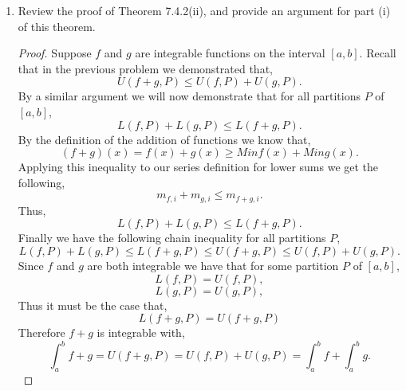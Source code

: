 \documentclass[12pt]{article}
\makeatletter
\theoremstyle{homework}
\newenvironment{exercise}[1]
{\def\@currentlabel{#1}\exercisecore}
{\endexercisecore}
\makeatother
\begin{document}
\begin{exercise}{Abbott 7.4.5}
\begin{enumerate}
	\item Review the proof of Theorem 7.4.2(ii), and provide an argument for part (i) of this theorem.\\ 
	\begin{proof}
		Suppose $f$ and $g$ are integrable functions on the interval $[a,b]$. Recall that in the previous problem we demonstrated that,
		\begin{equation*}
			U(f+g,P) \le U(f,P) + U(g,P).
		\end{equation*}
		By a similar argument we will now demonstrate that for all partitions $P$ of $[a,b]$,
		\begin{equation*}
			L(f,P) + L(g,P) \le L(f+g,P).
		\end{equation*}
		By the definition of the addition of functions we know that,
		\begin{equation*}
			(f+g)(x) = f(x) + g(x) \geq Min f(x)  +  Min g(x).
		\end{equation*}
		Applying this inequality to our series definition for lower sums we get the following,
		\begin{equation*}
		 m_{f,i} + m_{g,i} \le m_{f+g,i}.
		\end{equation*}
		Thus,
		\begin{equation*}
			L(f,P) + L(g,P) \le L(f+g,P).
		\end{equation*}
		Finally we have the following chain inequality for all partitions $P$,
		\begin{equation*}
			L(f,P) + L(g,P) \le L(f+g,P) \le U(f+g,P) \le U(f,P) + U(g,P).
		\end{equation*}
		Since $f$ and $g$ are both integrable we have that for some partition $P$ of $[a,b]$,
		\begin{equation*}
			L(f,P) = U(f,P),
		\end{equation*}
		\begin{equation*}
			L(g,P) = U(g,P),
		\end{equation*}
		Thus it must be the case that, 
		\begin{equation*}
			L(f+g,P)  =  U(f+g,P)
		\end{equation*}
		Therefore $f+g$ is integrable with,
		\begin{equation*}
			\int_a^b f+g = U(f+g,P) = U(f,P) + U(g,P) = \int_a^b f + \int_a^b g.
		\end{equation*}
	\end{proof}
	\end{enumerate}
\end{exercise}
\vspace{.5in}
\end{document}
